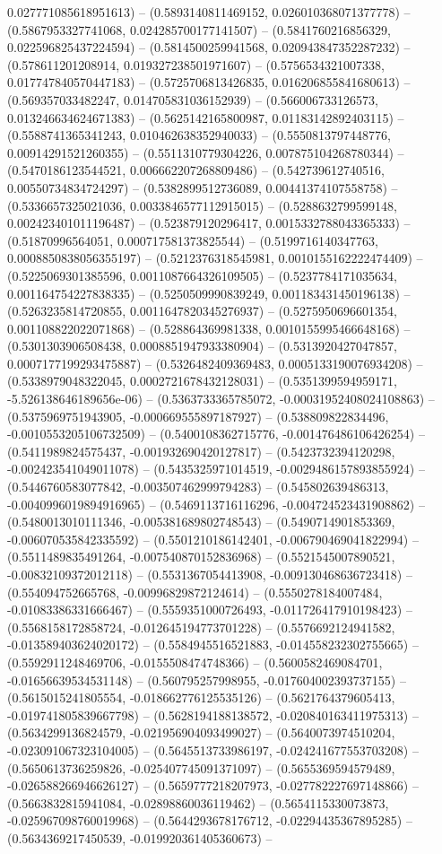 0.027771085618951613) -- (0.5893140811469152, 0.026010368071377778) -- (0.5867953327741068, 0.024285700177141507) -- (0.5841760216856329, 0.022596825437224594) -- (0.5814500259941568, 0.020943847352287232) -- (0.578611201208914, 0.019327238501971607) -- (0.5756534321007338, 0.017747840570447183) -- (0.5725706813426835, 0.016206855841680613) -- (0.569357033482247, 0.014705831036152939) -- (0.566006733126573, 0.013246634624671383) -- (0.5625142165800987, 0.01183142892403115) -- (0.5588741365341243, 0.010462638352940033) -- (0.5550813797448776, 0.00914291521260355) -- (0.5511310779304226, 0.007875104268780344) -- (0.5470186123544521, 0.006662207268809486) -- (0.542739612740516, 0.00550734834724297) -- (0.5382899512736089, 0.00441374107558758) -- (0.5336657325021036, 0.0033846577112915015) -- (0.5288632799599148, 0.002423401011196487) -- (0.523879120296417, 0.0015332788043365333) -- (0.51870996564051, 0.000717581373825544) -- (0.5199716140347763, 0.0008850838056355197) -- (0.5212376318545981, 0.0010155162222474409) -- (0.5225069301385596, 0.0011087664326109505) -- (0.5237784171035634, 0.001164754227838335) -- (0.5250509990839249, 0.001183431450196138) -- (0.5263235814720855, 0.0011647820345276937) -- (0.5275950696601354, 0.001108822022071868) -- (0.528864369981338, 0.0010155995466648168) -- (0.5301303906508438, 0.0008851947933380904) -- (0.5313920427047857, 0.0007177199293475887) -- (0.5326482409369483, 0.0005133190076934208) -- (0.5338979048322045, 0.0002721678432128031) -- (0.5351399594959171, -5.526138646189656e-06) -- (0.5363733365785072, -0.00031952408024108863) -- (0.5375969751943905, -0.000669555897187927) -- (0.538809822834496, -0.0010553205106732509) -- (0.5400108362715776, -0.001476486106426254) -- (0.5411989824575437, -0.001932690420127817) -- (0.5423732394120298, -0.002423541049011078) -- (0.5435325971014519, -0.0029486157893855924) -- (0.5446760583077842, -0.003507462999794283) -- (0.545802639486313, -0.0040996019894916965) -- (0.5469113716116296, -0.004724523431908862) -- (0.5480013010111346, -0.005381689802748543) -- (0.5490714901853369, -0.006070535842335592) -- (0.5501210186142401, -0.006790469041822994) -- (0.5511489835491264, -0.007540870152836968) -- (0.5521545007890521, -0.00832109372012118) -- (0.5531367054413908, -0.009130468636723418) -- (0.554094752665768, -0.00996829872124614) -- (0.5550278184007484, -0.01083386331666467) -- (0.5559351000726493, -0.011726417910198423) -- (0.5568158172858724, -0.012645194773701228) -- (0.5576692124941582, -0.013589403624020172) -- (0.5584945516521883, -0.014558232302755665) -- (0.5592911248469706, -0.0155508474748366) -- (0.5600582469084701, -0.01656639534531148) -- (0.560795257998955, -0.017604002393737155) -- (0.5615015241805554, -0.018662776125535126) -- (0.5621764379605413, -0.019741805839667798) -- (0.5628194188138572, -0.020840163411975313) -- (0.5634299136824579, -0.021956904093499027) -- (0.5640073974510204, -0.023091067323104005) -- (0.5645513733986197, -0.024241677553703208) -- (0.5650613736259826, -0.025407745091371097) -- (0.5655369594579489, -0.026588266946626127) -- (0.5659777218207973, -0.027782227697148866) -- (0.5663832815941084, -0.02898860036119462) -- (0.5654115330073873, -0.025967098760019968) -- (0.5644293678176712, -0.02294435367895285) -- (0.5634369217450539, -0.019920361405360673) -- 